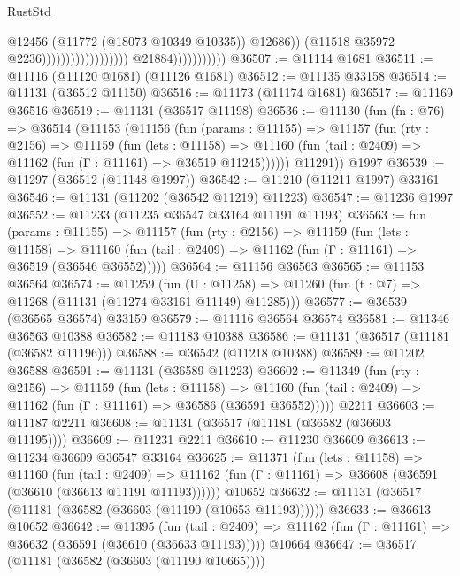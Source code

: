 \begin{lexlean}{RustStd}
\begin{coremodule}
                                                                @12456
                                                                (@11772 (@18073 @10349 @10335))
                                                                @12686))
                                                            (@11518 @35972 @2236))))))))))))))))))
                          @21884)))))))))))
@36507 := @11114 @1681
@36511 := @11116 (@11120 @1681) (@11126 @1681)
@36512 := @11135 @33158
@36514 := @11131 (@36512 @11150)
@36516 := @11173 (@11174 @1681)
@36517 := @11169 @36516
@36519 := @11131 (@36517 @11198)
@36536 := @11130
    (fun (fn : @76) =>
    @36514
      (@11153
        (@11156
          (fun (params : @11155) =>
          @11157
            (fun (rty : @2156) =>
            @11159
              (fun (lets : @11158) =>
              @11160 (fun (tail : @2409) => @11162 (fun (Γ : @11161) => @36519 @11245))))))
        @11291))
    @1997
@36539 := @11297 (@36512 (@11148 @1997))
@36542 := @11210 (@11211 @1997) @33161
@36546 := @11131 (@11202 (@36542 @11219) @11223)
@36547 := @11236 @1997
@36552 := @11233 (@11235 @36547 @33164 @11191 @11193)
@36563 := fun (params : @11155) =>
  @11157
    (fun (rty : @2156) =>
    @11159
      (fun (lets : @11158) =>
      @11160 (fun (tail : @2409) => @11162 (fun (Γ : @11161) => @36519 (@36546 @36552)))))
@36564 := @11156 @36563
@36565 := @11153 @36564
@36574 := @11259
    (fun (U : @11258) => @11260 (fun (t : @7) => @11268 (@11131 (@11274 @33161 @11149) @11285)))
@36577 := @36539 (@36565 @36574) @33159
@36579 := @11116 @36564 @36574
@36581 := @11346 @36563 @10388
@36582 := @11183 @10388
@36586 := @11131 (@36517 (@11181 (@36582 @11196)))
@36588 := @36542 (@11218 @10388)
@36589 := @11202 @36588
@36591 := @11131 (@36589 @11223)
@36602 := @11349
    (fun (rty : @2156) =>
    @11159
      (fun (lets : @11158) =>
      @11160 (fun (tail : @2409) => @11162 (fun (Γ : @11161) => @36586 (@36591 @36552)))))
    @2211
@36603 := @11187 @2211
@36608 := @11131 (@36517 (@11181 (@36582 (@36603 @11195))))
@36609 := @11231 @2211
@36610 := @11230 @36609
@36613 := @11234 @36609 @36547 @33164
@36625 := @11371
    (fun (lets : @11158) =>
    @11160
      (fun (tail : @2409) =>
      @11162 (fun (Γ : @11161) => @36608 (@36591 (@36610 (@36613 @11191 @11193))))))
    @10652
@36632 := @11131 (@36517 (@11181 (@36582 (@36603 (@11190 (@10653 @11193))))))
@36633 := @36613 @10652
@36642 := @11395
    (fun (tail : @2409) => @11162 (fun (Γ : @11161) => @36632 (@36591 (@36610 (@36633 @11193)))))
    @10664
@36647 := @36517 (@11181 (@36582 (@36603 (@11190 @10665))))

\end{coremodule}
\end{lexlean}
